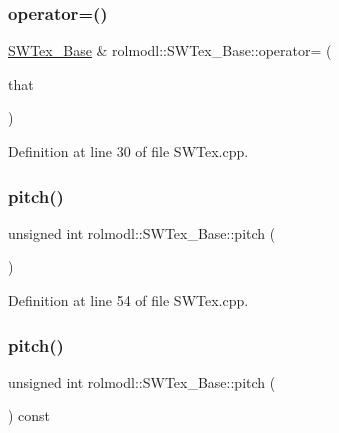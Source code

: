 \subsubsection{\texorpdfstring{operator=()}{operator=()}\hspace{0.1cm}{\footnotesize\ttfamily [2/2]}}
{\footnotesize\ttfamily \mbox{\hyperlink{classrolmodl_1_1_s_w_tex___base}{S\+W\+Tex\+\_\+\+Base}} \& rolmodl\+::\+S\+W\+Tex\+\_\+\+Base\+::operator= (\begin{DoxyParamCaption}\item[{\mbox{\hyperlink{classrolmodl_1_1_s_w_tex___base}{S\+W\+Tex\+\_\+\+Base}} \&\&}]{that }\end{DoxyParamCaption})\hspace{0.3cm}{\ttfamily [noexcept]}}



Definition at line 30 of file S\+W\+Tex.\+cpp.

\mbox{\label{classrolmodl_1_1_s_w_tex___base_a029e49ecd18d8f518d0f5fe3550c8873}} 
\subsubsection{\texorpdfstring{pitch()}{pitch()}\hspace{0.1cm}{\footnotesize\ttfamily [1/2]}}
{\footnotesize\ttfamily unsigned int rolmodl\+::\+S\+W\+Tex\+\_\+\+Base\+::pitch (\begin{DoxyParamCaption}{ }\end{DoxyParamCaption})\hspace{0.3cm}{\ttfamily [noexcept]}}



Definition at line 54 of file S\+W\+Tex.\+cpp.

\mbox{\label{classrolmodl_1_1_s_w_tex___base_aa59f8fa61de6ed292e1eaea6730939c2}} 
\subsubsection{\texorpdfstring{pitch()}{pitch()}\hspace{0.1cm}{\footnotesize\ttfamily [2/2]}}
{\footnotesize\ttfamily unsigned int rolmodl\+::\+S\+W\+Tex\+\_\+\+Base\+::pitch (\begin{DoxyParamCaption}{ }\end{DoxyParamCaption}) const\hspace{0.3cm}{\ttfamily [noexcept]}}



